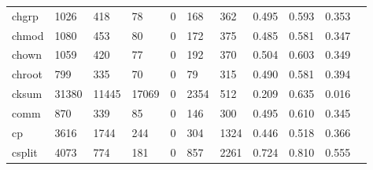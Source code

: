 \begin{longtable}{lp{1.10cm}p{1.10cm}p{1.10cm}p{1.10cm}p{1.10cm}p{1.10cm}p{1.10cm}p{1.10cm}p{1.10cm}p{1.10cm}}
chgrp     &                   1026 &                                418 &                                78 &                                0 &                               168 &                             362 &                          0.495 &                                 0.593 &                               0.353 \\
chmod     &                   1080 &                                453 &                                80 &                                0 &                               172 &                             375 &                          0.485 &                                 0.581 &                               0.347 \\
chown     &                   1059 &                                420 &                                77 &                                0 &                               192 &                             370 &                          0.504 &                                 0.603 &                               0.349 \\
chroot    &                    799 &                                335 &                                70 &                                0 &                                79 &                             315 &                          0.490 &                                 0.581 &                               0.394 \\
cksum     &                  31380 &                              11445 &                             17069 &                                0 &                              2354 &                             512 &                          0.209 &                                 0.635 &                               0.016 \\
comm      &                    870 &                                339 &                                85 &                                0 &                               146 &                             300 &                          0.495 &                                 0.610 &                               0.345 \\
cp        &                   3616 &                               1744 &                               244 &                                0 &                               304 &                            1324 &                          0.446 &                                 0.518 &                               0.366 \\
csplit    &                   4073 &                                774 &                               181 &                                0 &                               857 &                            2261 &                          0.724 &                                 0.810 &                               0.555 \\

\end{longtable}
